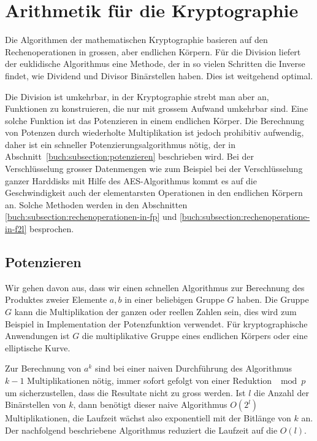 %
%
%
\section{Arithmetik für die Kryptographie
\label{buch:section:arithmetik-fuer-kryptographie}}
Die Algorithmen der mathematischen Kryptographie basieren
auf den Rechenoperationen in grossen, aber endlichen Körpern.
Für die Division liefert der euklidische Algorithmus eine
Methode, der in so vielen Schritten die Inverse findet,
wie Dividend und Divisor Binärstellen haben.
Dies ist weitgehend optimal.

Die Division ist umkehrbar, in der Kryptographie strebt man aber an,
Funktionen zu konstruieren, die nur mit grossem Aufwand umkehrbar sind.
Eine solche Funktion ist das Potenzieren in einem endlichen Körper.
Die Berechnung von Potenzen durch wiederholte Multiplikation ist jedoch
prohibitiv aufwendig, daher ist ein schneller Potenzierungsalgorithmus
nötig, der in Abschnitt~\ref{buch:subsection:potenzieren} beschrieben
wird.
Bei der Verschlüsselung grosser Datenmengen wie zum Beispiel bei
der Verschlüsselung ganzer Harddisks mit Hilfe des AES-Algorithmus
kommt es auf die Geschwindigkeit auch der elementarsten Operationen
in den endlichen Körpern an.
Solche Methoden werden in den Abschnitten
\ref{buch:subsection:rechenoperationen-in-fp}
und
\ref{buch:subsection:rechenoperatione-in-f2l}
besprochen.

\subsection{Potenzieren
\label{buch:subsection:potenzieren}}
Wir gehen davon aus, dass wir einen schnellen Algorithmus zur
Berechnung des Produktes zweier Elemente $a,b$ in einer
beliebigen Gruppe $G$ haben.
Die Gruppe $G$ kann die Multiplikation der ganzen oder reellen Zahlen
sein, dies wird zum Beispiel in Implementation der Potenzfunktion
verwendet.
Für kryptographische Anwendungen ist $G$ die multiplikative Gruppe
eines endlichen Körpers oder eine elliptische Kurve.

Zur Berechnung von $a^k$ sind bei einer naiven Durchführung des
Algorithmus $k-1$ Multiplikationen nötig, immer sofort gefolgt
von einer Reduktion $\mod p$ um sicherzustellen, dass die Resultate
nicht zu gross werden.
Ist $l$ die Anzahl der Binärstellen von $k$, dann benötigt dieser
naive Algorithmus $O(2^l)$ Multiplikationen, die Laufzeit wächst
also exponentiell mit der Bitlänge von $k$ an.
Der nachfolgend beschriebene Algorithmus reduziert die Laufzeit auf
die $O(l)$.

